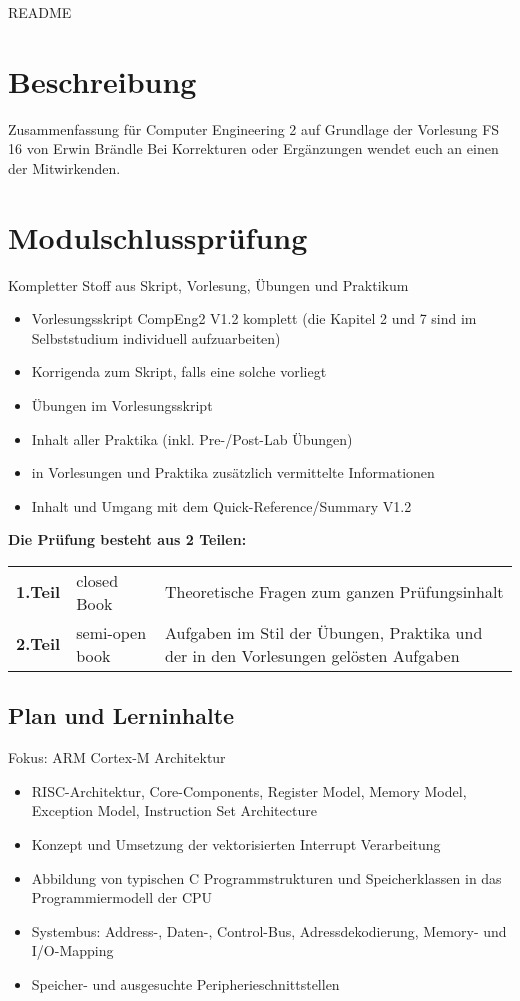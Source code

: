 \thispagestyle{empty}
\setcounter{page}{0} %
{\huge README }
\section*{Beschreibung}
Zusammenfassung für Computer Engineering 2 auf Grundlage der Vorlesung FS 16 von Erwin Brändle \newline
Bei Korrekturen oder Ergänzungen wendet euch an einen der Mitwirkenden.

\section*{Modulschlussprüfung}
Kompletter Stoff aus Skript, Vorlesung, Übungen und Praktikum
{\scriptsize 
    \begin{itemize}
        \item Vorlesungsskript CompEng2 V1.2 komplett
        \subitem(die Kapitel 2 und 7 sind im Selbststudium individuell aufzuarbeiten)
        \item Korrigenda zum Skript, falls eine solche vorliegt
        \item Übungen im Vorlesungsskript
        \item Inhalt aller Praktika (inkl. Pre-/Post-Lab Übungen)
        \item in Vorlesungen und Praktika zusätzlich vermittelte Informationen
        \item Inhalt und Umgang mit dem Quick-Reference/Summary V1.2
    \end{itemize}
}
\textbf{Die Prüfung besteht aus 2 Teilen:}\newline
\begin{tabular}{p{1.5cm} p{3cm} p{10cm}}
    \textbf{ 1.Teil}   & closed Book & Theoretische Fragen zum ganzen Prüfungsinhalt \\ 
    \textbf{ 2.Teil}   & semi-open book & Aufgaben im Stil der Übungen, Praktika und der in den Vorlesungen gelösten Aufgaben \\ 
\end{tabular} 

\subsection*{Plan und Lerninhalte}
Fokus: ARM Cortex-M Architektur
{\scriptsize 
    \begin{itemize}
        \item RISC-Architektur, Core-Components, Register Model, Memory Model, Exception Model, Instruction Set Architecture
        \item Konzept und Umsetzung der vektorisierten Interrupt Verarbeitung
        \item Abbildung von typischen C Programmstrukturen und Speicherklassen in das Programmiermodell der CPU
        \item Systembus: Address-, Daten-, Control-Bus, Adressdekodierung, Memory- und I/O-Mapping
        \item Speicher- und ausgesuchte Peripherieschnittstellen
    \end{itemize}
}
\vfill
